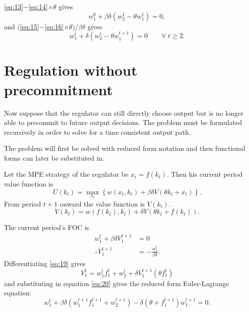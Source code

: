 \documentclass{amsart}
\begin{document}
\eqref{eq:13}$-$\eqref{eq:14}$\times\theta$ gives
\begin{equation}
  \label{eq:16} w^0_1 + \beta\delta \left(w^1_2 - \theta w^1_1 \right)
= 0,
\end{equation} and $($\eqref{eq:15}$-$\eqref{eq:16}$\times\theta ) /
\beta\delta$ gives
\begin{equation}
  \label{eq:17} w^t_1 + \delta \left(w^t_2 - \theta w^{t+1}_1 \right)
= 0 \qquad \forall\; t \geq 2.
\end{equation}


\section{Regulation without precommitment}
\label{sec:regul-with-prec-2}

Now suppose that the regulator can still directly choose output but is
no longer able to precommit to future output decisions. The problem
must be formulated recursively in order to solve for a time consistent
output path.

The problem will first be solved with reduced form notation and then
functional forms can later be substituted in.

Let the MPE strategy of the regulator be $x_t = f(k_t)$. Then his
current period value function is
\begin{equation}
  \label{eq:18} U(k_t) = \max_{x_t} \left\{ w(x_t,k_t) + \beta\delta
V( \theta k_t + x_t) \right\}.
\end{equation} From period $t+1$ onward the value function is
$V(k_t)$.
\begin{equation}
  \label{eq:19} V(k_t) = w\left( f(k_t),k_t\right) + \delta V\left(
\theta k_t + f(k_t) \right).
\end{equation}

The current period's FOC is
\begin{align} w^t_1 + \beta\delta V^{t+1}_1 &= 0 \\ \label{eq:20}
\therefore V^{t+1}_1 &= -\frac{w^t_1}{\beta\delta}.
\end{align} Differentiating \eqref{eq:19} gives
\begin{equation}
  \label{eq:21} V^t_1 = w^t_1f^t_1 + w^t_2 + \delta V^{t+1}_1 (\theta
f^t_1)
\end{equation} and substituting in equation \eqref{eq:20} gives the
reduced form Euler-Lagrange equation:
\begin{equation}
  \label{eq:22} w^t_1 + \beta\delta( w^{t+1}_1 f^{t+1}_1 + w^{t+1}_2 )
- \delta (\theta + f^{t+1}_1)w^{t+1}_1 = 0.
\end{equation}
\end{document}
